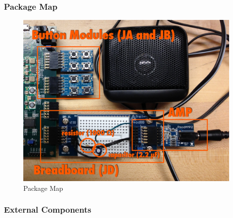 \documentclass{article}
\begin{document}
    \newpage
    \subsubsection{Package Map}


      \begin{figure}[H]
        \centering
        \includegraphics[width=6.5in]{img/packagemap.jpg}
        \caption{Package Map}
      \end{figure}

    \subsubsection{External Components}
\end{document}
